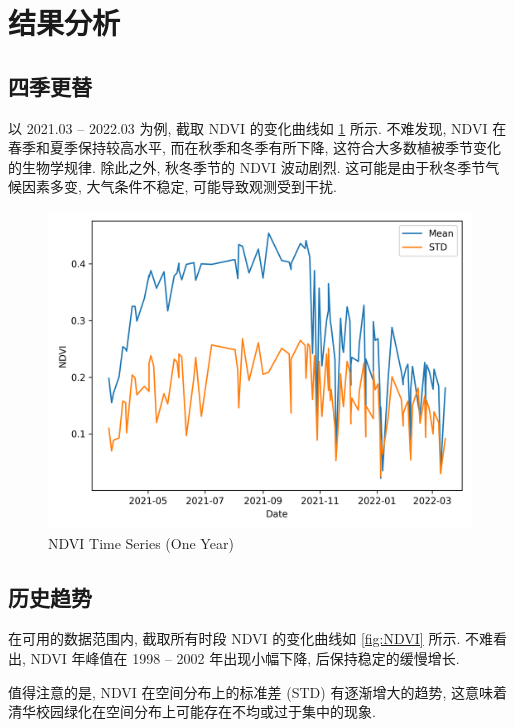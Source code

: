 
\section{结果分析}

\subsection{四季更替}

以 2021.03 -- 2022.03 为例, 截取 NDVI 的变化曲线如 \cref{fig:NDVI-year} 所示.
不难发现, NDVI 在春季和夏季保持较高水平, 而在秋季和冬季有所下降, 这符合大多数植被季节变化的生物学规律.
除此之外, 秋冬季节的 NDVI 波动剧烈.
这可能是由于秋冬季节气候因素多变, 大气条件不稳定, 可能导致观测受到干扰.

\begin{figure}[htbp]
  \centering
  \includegraphics[width=140mm]{assets/NDVI-year.png}
  \caption{NDVI Time Series (One Year)}
  \label{fig:NDVI-year}
\end{figure}

\subsection{历史趋势}

在可用的数据范围内, 截取所有时段 NDVI 的变化曲线如 \cref{fig:NDVI} 所示.
不难看出, NDVI 年峰值在 1998 -- 2002 年出现小幅下降, 后保持稳定的缓慢增长.

值得注意的是,  NDVI 在空间分布上的标准差 (STD) 有逐渐增大的趋势, 这意味着清华校园绿化在空间分布上可能存在不均或过于集中的现象.

